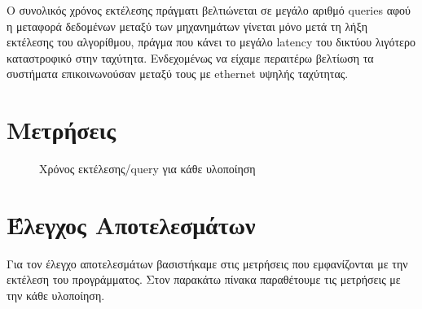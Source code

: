 \documentclass[11pt]{scrartcl} %
\begin{document}
Ο συνολικός χρόνος εκτέλεσης πράγματι βελτιώνεται σε μεγάλο αριθμό queries αφού η μεταφορά δεδομένων μεταξύ των μηχανημάτων γίνεται μόνο
μετά τη λήξη εκτέλεσης του αλγορίθμου, πράγμα που κάνει το μεγάλο latency του δικτύου λιγότερο καταστροφικό στην ταχύτητα.
Ενδεχομένως να είχαμε περαιτέρω βελτίωση τα συστήματα επικοινωνούσαν μεταξύ τους με ethernet υψηλής ταχύτητας. \cite{mpi-ethernet}

\section{Μετρήσεις}

\begin{figure}[H]
    \begin{center}
    \end{center}
    \caption{Χρόνος εκτέλεσης/query για κάθε υλοποίηση}
    \label{fig:cluster_times}
\end{figure}

\section{Έλεγχος Αποτελεσμάτων}

Για τον έλεγχο αποτελεσμάτων βασιστήκαμε στις μετρήσεις που εμφανίζονται με την εκτέλεση του προγράμματος.
Στον παρακάτω πίνακα παραθέτουμε τις μετρήσεις με την κάθε υλοποίηση.
\end{document}
